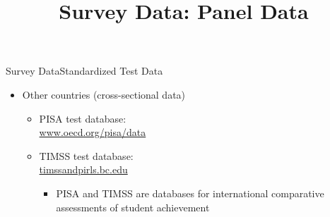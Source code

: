 \documentclass[hyperref={pdfpagelabels=false}]{beamer}
\begin{document}
\begin{frame}{Survey Data}{Standardized Test Data}
	\begin{itemize} 
		\item Other countries (cross-sectional data)
		\begin{itemize} 
			\vspace{0.3cm}
			\item PISA test database: \\ 
			\href{https://www.oecd.org/pisa/data/}{www.oecd.org/pisa/data}
			\vspace{0.3cm}
			\item TIMSS test database: \\
			\href{https://timssandpirls.bc.edu/}{timssandpirls.bc.edu} 
			\vspace{0.3cm}
			\begin{itemize}
				\item PISA and TIMSS are databases for international comparative assessments of student achievement 
			\end{itemize}
		\end{itemize}
		
	\end{itemize}
\end{frame}





\title[]  
{Survey Data: Panel Data}


\author 
{}

\institute{}






\date
{}


\begin{frame}{}
	\titlepage
\end{frame}
\end{document}
